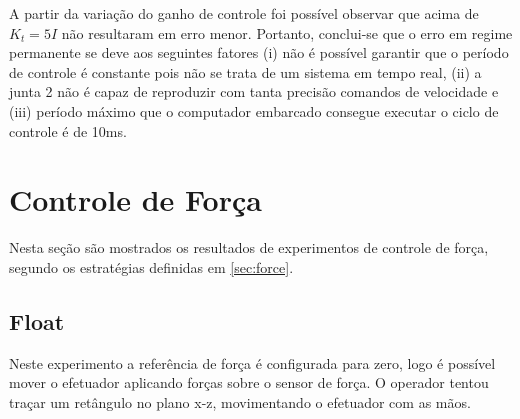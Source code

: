 A partir da variação do ganho de controle foi possível observar que acima de ${K}_t = 5 {I}$ não resultaram em erro menor. Portanto, conclui-se que o erro em regime permanente se deve aos seguintes fatores (i) não é possível garantir que o período de controle é constante pois não se trata de um sistema em tempo real, (ii) a junta 2 não é capaz de reproduzir com tanta precisão comandos de velocidade e (iii) período máximo que o computador embarcado consegue executar o ciclo de controle é de 10ms.

 
\section{Controle de Força}

Nesta seção são mostrados os resultados de experimentos de controle de força, segundo os estratégias definidas em \ref{sec:force}. 

\subsection{Float}
Neste experimento a referência de força é configurada para zero, logo é possível mover o efetuador aplicando forças sobre o  sensor de força. O operador tentou traçar um retângulo no plano x-z, movimentando o efetuador com as mãos.

